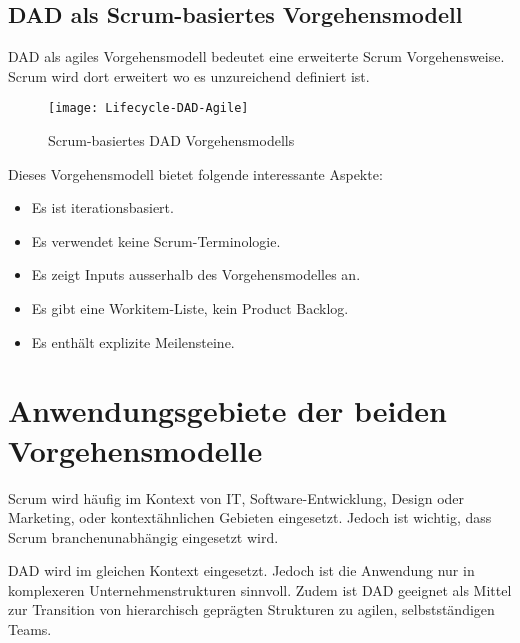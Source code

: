 \subsection{DAD als Scrum-basiertes Vorgehensmodell}

DAD als agiles Vorgehensmodell bedeutet eine erweiterte Scrum Vorgehensweise. Scrum wird dort erweitert wo es unzureichend definiert ist.


\begin{figure}[H]
	\centering
	\texttt{[image: Lifecycle-DAD-Agile]}
	\caption{Scrum-basiertes DAD Vorgehensmodells}
	\label{fig:lifecycle}
\end{figure}\medskip


Dieses Vorgehensmodell bietet folgende interessante Aspekte:
\begin{itemize}
	\item Es ist iterationsbasiert.
	\item Es verwendet keine Scrum-Terminologie.
	\item Es zeigt Inputs ausserhalb des Vorgehensmodelles an.
	\item Es gibt eine Workitem-Liste, kein Product Backlog.
	\item Es enthält explizite Meilensteine.
\end{itemize}

\section{Anwendungsgebiete der beiden Vorgehensmodelle}

Scrum wird häufig im Kontext von IT, Software-Entwicklung, Design oder Marketing, oder kontextähnlichen Gebieten eingesetzt. Jedoch ist wichtig, dass Scrum branchenunabhängig eingesetzt wird.

DAD wird im gleichen Kontext eingesetzt. Jedoch ist die Anwendung nur in komplexeren Unternehmenstrukturen sinnvoll. Zudem ist DAD geeignet als Mittel zur Transition von hierarchisch geprägten Strukturen zu agilen, selbstständigen Teams.
 
